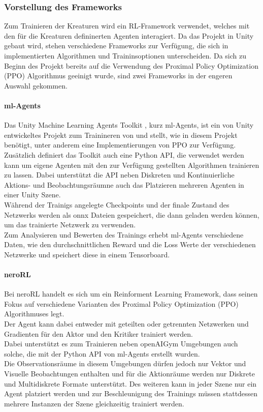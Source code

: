 \subsubsection{Vorstellung des Frameworks}
Zum Trainieren der Kreaturen wird ein RL-Framework verwendet, welches mit den für die Kreaturen defininerten Agenten interagiert. Da das Projekt in Unity gebaut wird, stehen verschiedene Frameworks zur Verfügung, die sich in implementierten Algorithmen und Traininsoptionen unterscheiden. Da sich zu Beginn des Projekt bereits auf die Verwendung des Proximal Policy Optimization (PPO) Algorithmus geeinigt wurde, sind zwei Frameworks in der engeren Auswahl gekommen.

\paragraph{ml-Agents}\fup \label{mlAgentsFramework}
Das Unity Machine Learning Agents Toolkit \cite{juliani2020}, kurz ml-Agents, ist ein von Unity entwickeltes Projekt zum Trainineren von  und stellt, wie in diesem Projekt benötigt, unter anderem eine Implementierungen von PPO zur Verfügung.
Zusätzlich definiert das Toolkit auch eine Python API, die verwendet werden kann um eigene Agenten mit den zur Verfügung gestellten Algorithmen trainieren zu lassen.
Dabei unterstützt die API neben Diskreten und Kontinuierliche Aktions- und Beobachtungsräumne auch das Platzieren mehreren Agenten in einer Unity Szene.\\

\noindent Während der Trainigs angelegte Checkpoints und der finale Zustand des Netzwerks werden als onnx Dateien gespeichert, die dann geladen werden können, um das trainierte Netzwerk zu verwenden.\\
Zum Analysieren und Bewerten des Trainings erhebt ml-Agents verschiedene Daten, wie den durchschnittlichen Reward und die Loss Werte der verschiedenen Netzwerke und speichert diese in einem Tensorboard. 

\paragraph{neroRL}\fup \label{neroRLFramework}
Bei neroRL \cite{neroRL} handelt es sich um ein Reinforment Learning Framework, dass seinen Fokus auf verschiedene Varianten des Proximal Policy Optimization (PPO) Algorithmuses legt.\\
Der Agent kann dabei entweder mit geteilten oder getrennten Netzwerken und Gradienten für den Aktor und den Kritiker trainiert werden. \\
Dabei unterstützt es zum Trainieren neben openAIGym Umgebungen auch solche, die mit der Python API von ml-Agents erstellt wurden.\\
Die Observationsräume in diesem Umgebungen dürfen jedoch nur Vektor und Visuelle Beobachtungen enthalten und für die Aktionräume werden nur Diskrete und Multidiskrete Formate unterstützt.
Des weiteren kann in jeder Szene nur ein Agent platziert werden und zur Beschleunigung des Trainings müssen stattdessen mehrere Instanzen der Szene gleichzeitig trainiert werden.\\

